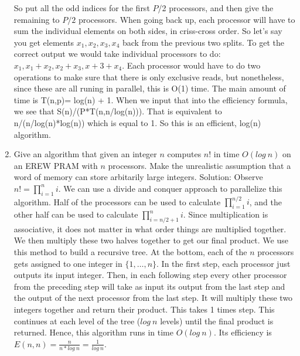 \documentclass{article}
\begin{document}
\begin{enumerate}
So put all the odd indices for the first $P$/2 processors, and then give the remaining to $P/2$ processors. When going back up, each processor will
have to sum the individual elements on both sides, in criss-cross order. So let's say you get elements $x_1,x_2,x_3,x_4$ back from the previous two splits. To get the correct
output we would take individual processors to do: $x_1, x_1+x_2, x_2+x_3, x+3+x_4$. Each processor would have to do two operations to make sure that there is only
exclusive reads, but nonetheless, since these are all runing in parallel, this is O(1) time. The main amount of time is T(n,p)= log(n) + 1. When we input that
into the efficiency formula, we see that S(n)/(P*T(n,n/log(n))). That is equivalent to n/(n/log(n)*log(n)) which is equal to 1. So this is an efficient, log(n) algorithm.
\newline
\item Give an algorithm that given an integer $n$ computes $n!$ in time $O(log\ n)$ on an EREW PRAM with $n$ processors. Make the unrealistic assumption that a word of memory can store arbitarily large integers.
\newline
\newline Solution: Observe $n!=\prod\limits_{i=1}^{n}i$. We can use a divide and conquer approach to parallelize this algorithm. Half of the processors can be used to calculate $\prod\limits_{i=1}^{n/2}i$, and the other half can be used to calculate $\prod\limits_{i=n/2+1}^{n}i$. Since multiplication is associative, it does not matter in what order things are multiplied together. We then multiply these two halves together to get our final product. We use this method to build a recursive tree. At the bottom, each of the $n$ processors gets assigned to one integer in $\{1,\ldots ,n\}$. In the first step, each processor just outputs its input integer. Then, in each following step every other processor from the preceding step will take as input its output from the last step and the output of the next processor from the last step. It will multiply these two integers together and return their product. This takes 1 times step. This continues at each level of the tree ($log\ n$ levels) until the final product is returned. Hence, this algorithm runs in time $O(log\ n)$. Its efficiency is $E(n,n)=\frac{n}{n*log\ n}=\frac{1}{log\ n}$.
\end{enumerate}
\end{document}
